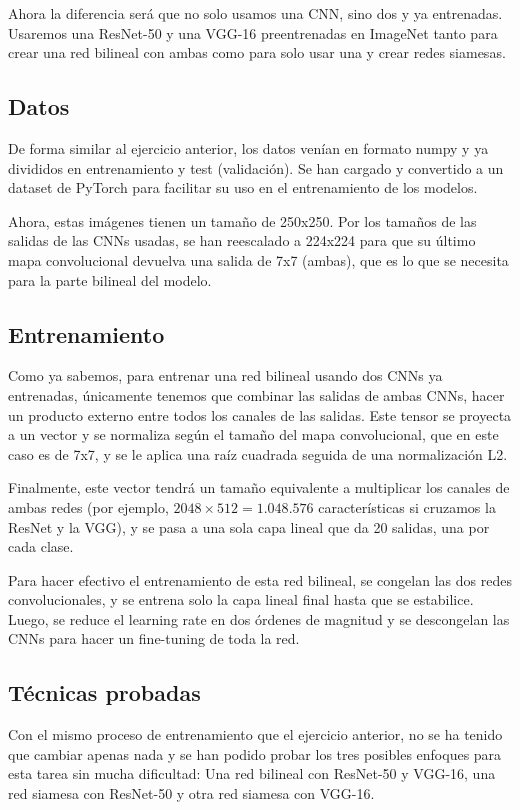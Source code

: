 \documentclass[11pt,spanish,listoffigures,listoftables]{tfgetsinf}
\begin{document}
Ahora la diferencia será que no solo usamos una CNN, sino dos y ya entrenadas. Usaremos una ResNet-50 y una VGG-16 preentrenadas en ImageNet tanto para crear una red bilineal con ambas como para solo usar una y crear redes siamesas.

\subsection{Datos}
De forma similar al ejercicio anterior, los datos venían en formato numpy y ya divididos en entrenamiento y test (validación). Se han cargado y convertido a un dataset de PyTorch para facilitar su uso en el entrenamiento de los modelos.

Ahora, estas imágenes tienen un tamaño de 250x250. Por los tamaños de las salidas de las CNNs usadas, se han reescalado a 224x224 para que su último mapa convolucional devuelva una salida de 7x7 (ambas), que es lo que se necesita para la parte bilineal del modelo.

\subsection{Entrenamiento}
Como ya sabemos, para entrenar una red bilineal usando dos CNNs ya entrenadas, únicamente tenemos que combinar las salidas de ambas CNNs, hacer un producto externo entre todos los canales de las salidas. Este tensor se proyecta a un vector y se normaliza según el tamaño del mapa convolucional, que en este caso es de 7x7, y se le aplica una raíz cuadrada seguida de una normalización L2. 

Finalmente, este vector tendrá un tamaño equivalente a multiplicar los canales de ambas redes (por ejemplo, $2048 \times 512 = 1.048.576$ características si cruzamos la ResNet y la VGG), y se pasa a una sola capa lineal que da 20 salidas, una por cada clase.

Para hacer efectivo el entrenamiento de esta red bilineal, se congelan las dos redes convolucionales, y se entrena solo la capa lineal final hasta que se estabilice. Luego, se reduce el learning rate en dos órdenes de magnitud y se descongelan las CNNs para hacer un fine-tuning de toda la red.

\subsection{Técnicas probadas}
Con el mismo proceso de entrenamiento que el ejercicio anterior, no se ha tenido que cambiar apenas nada y se han podido probar los tres posibles enfoques para esta tarea sin mucha dificultad: Una red bilineal con ResNet-50 y VGG-16, una red siamesa con ResNet-50 y otra red siamesa con VGG-16. 
\end{document}
